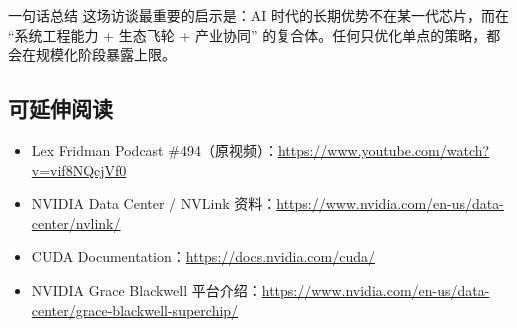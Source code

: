\documentclass[a4paper]{article}
\begin{document}
\begin{importantbox}{一句话总结}
这场访谈最重要的启示是：AI 时代的长期优势不在某一代芯片，而在 ``系统工程能力 + 生态飞轮 + 产业协同'' 的复合体。任何只优化单点的策略，都会在规模化阶段暴露上限。
\end{importantbox}

\subsection{可延伸阅读}

\begin{itemize}
    \item Lex Fridman Podcast \#494（原视频）：\url{https://www.youtube.com/watch?v=vif8NQcjVf0}
    \item NVIDIA Data Center / NVLink 资料：\url{https://www.nvidia.com/en-us/data-center/nvlink/}
    \item CUDA Documentation：\url{https://docs.nvidia.com/cuda/}
    \item NVIDIA Grace Blackwell 平台介绍：\url{https://www.nvidia.com/en-us/data-center/grace-blackwell-superchip/}
\end{itemize}

\end{document}
